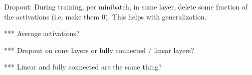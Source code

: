 \documentclass[12pt]{article}
\begin{document}
Dropout: During training, per minibatch, in some layer, delete some fraction of the activations (i.e. make them 0). This helps with generalization.

*** Average activations?

*** Dropout on conv layers or fully connected / linear layers?

*** Linear and fully connected are the same thing?
\end{document}
